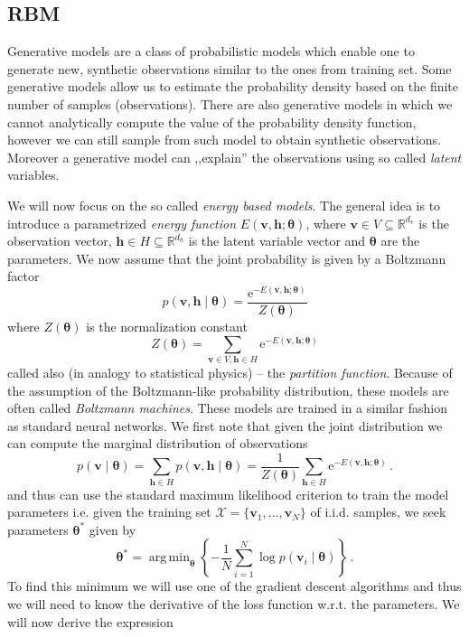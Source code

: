 \documentclass[a5paper]{article}
\newcommand{\Rbb}{\mathbb{R}}
\newcommand{\e}{\mathrm{e}}
\newcommand{\mc}[1]{\mathcal{#1}}
\DeclareMathOperator*{\argmin}{arg\,min}
\begin{document}
\subsection{RBM}

Generative models are a class of probabilistic models which enable one to generate new, synthetic
observations similar to the ones from training set. Some generative models allow us to estimate the
probability density based on the finite number of samples (observations). There are also generative
models in which we cannot analytically compute the value of the probability density function,
however we can still sample from such model to obtain synthetic observations. Moreover a generative
model can ,,explain'' the observations using so called \emph{latent} variables.

We will now focus on the so called \emph{energy based models}. The general idea is to introduce a
parametrized \emph{energy function} \(E(\bm{v},\bm{h}; \bm{\theta})\), where \(\bm{v} \in V
\subseteq \Rbb^{d_v}\) is the observation vector, \(\bm{h} \in H \subseteq \Rbb^{d_h}\) is the
latent variable vector and \(\bm{\theta}\) are the parameters. We now assume that the joint
probability is given by a Boltzmann factor
\[
   p(\bm{v},\bm{h} \mid \bm{\theta}) = \frac{\e^{- E( \bm{v}, \bm{h}; \bm{\theta})}}{Z(\bm{\theta})}
\]
where \(Z(\bm{\theta})\) is the normalization constant
\[
   Z(\bm{\theta}) = \sum_{\bm{v} \in V, \bm{h} \in H} \e^{-E(\bm{v},\bm{h}; \bm{\theta})}
\]
called also (in analogy to statistical physics) -- the \emph{partition function}. Because of the
assumption of the Boltzmann-like probability distribution, these models are often called
\emph{Boltzmann machines}. These models are trained in a similar fashion as standard neural
networks. We first note that given the joint distribution we can compute the marginal distribution
of observations
\[
   p(\bm{v} \mid \bm{\theta}) = \sum_{\bm{h} \in H} p(\bm{v},\bm{h} \mid \bm{\theta}) 
                              = \frac{1}{Z(\bm{\theta})} \sum_{\bm{h} \in H} \e^{-E(\bm{v},\bm{h}; \bm{\theta})}\,.
\]
and thus can use the standard maximum likelihood criterion to train the model parameters i.e. given
the training set \(\mc{X} = \{\bm{v}_1, \ldots, \bm{v}_N\}\) of i.i.d. samples, we seek parameters
\(\bm{\theta}^*\) given by
\[
   \bm{\theta}^* = \argmin_{\bm{\theta}} \left\{ -\frac{1}{N} \sum_{i=1}^N \log p\left(\bm{v}_i \mid \bm{\theta}\right) \right\}\,.
\]
To find this minimum we will use one of the gradient descent algorithms and thus we will need to
know the derivative of the loss function w.r.t. the parameters. We will now derive the expression
\end{document}
